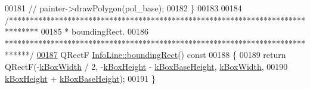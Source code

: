 \begin{DoxyCode}
00181 \textcolor{comment}{//  painter->drawPolygon(pol\_base);}
00182 \}
00183 
00184 \textcolor{comment}{/*******************************************************************************}
00185 \textcolor{comment}{ * boundingRect.}
00186 \textcolor{comment}{ ******************************************************************************/}
\hypertarget{infoline_8cpp_source_l00187}{}\hyperlink{class_info_line_a3103eee5d5a8b4fd53d428f9aea01830}{00187} QRectF \hyperlink{class_info_line_a3103eee5d5a8b4fd53d428f9aea01830}{InfoLine::boundingRect}()\textcolor{keyword}{ const}
00188 \textcolor{keyword}{}\{
00189   \textcolor{keywordflow}{return} QRectF(-\hyperlink{class_info_line_af71f2b91ea77398bd770b973b71e2896}{kBoxWidth} / 2, -\hyperlink{class_info_line_a279cafcac8d844a00bd27dde524102dd}{kBoxHeight} - \hyperlink{class_info_line_ab332e0b1c83e5ab8f551e3f39b2dfc55}{kBoxBaseHeight}, 
      \hyperlink{class_info_line_af71f2b91ea77398bd770b973b71e2896}{kBoxWidth},
00190                 \hyperlink{class_info_line_a279cafcac8d844a00bd27dde524102dd}{kBoxHeight} + \hyperlink{class_info_line_ab332e0b1c83e5ab8f551e3f39b2dfc55}{kBoxBaseHeight});
00191 \}
\end{DoxyCode}
